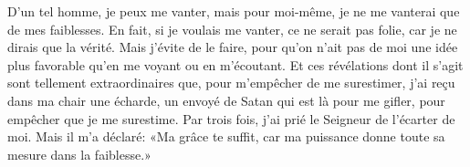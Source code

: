 D’un tel homme, je peux me vanter,
	mais pour moi-même, je ne me vanterai que de mes faiblesses.
En fait, si je voulais me vanter, ce ne serait pas folie,
	car je ne dirais que la vérité.
Mais j’évite de le faire,
	pour qu’on n’ait pas de moi une idée plus favorable
		qu’en me voyant ou en m’écoutant.
Et ces révélations dont il s’agit sont tellement extraordinaires
	que, pour m’empêcher de me surestimer,
	j’ai reçu dans ma chair une écharde,
	un envoyé de Satan qui est là pour me gifler,
	pour empêcher que je me surestime.
Par trois fois, j’ai prié le Seigneur de l’écarter de moi.
Mais il m’a déclaré: «Ma grâce te suffit,
	car ma puissance donne toute sa mesure dans la faiblesse.»
